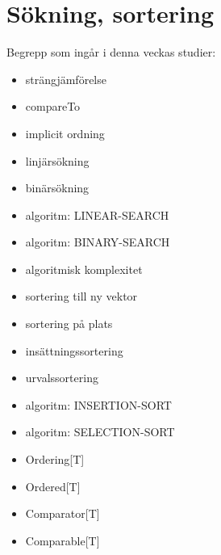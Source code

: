 \chapter{Sökning, sortering}\label{chapter:W11}
Begrepp som ingår i denna veckas studier:
\begin{itemize}[noitemsep,label={$\square$},leftmargin=*]
\item strängjämförelse
\item compareTo
\item implicit ordning
\item linjärsökning
\item binärsökning
\item algoritm: LINEAR-SEARCH
\item algoritm: BINARY-SEARCH
\item algoritmisk komplexitet
\item sortering till ny vektor
\item sortering på plats
\item insättningssortering
\item urvalssortering
\item algoritm: INSERTION-SORT
\item algoritm: SELECTION-SORT
\item Ordering[T]
\item Ordered[T]
\item Comparator[T]
\item Comparable[T]\end{itemize}
